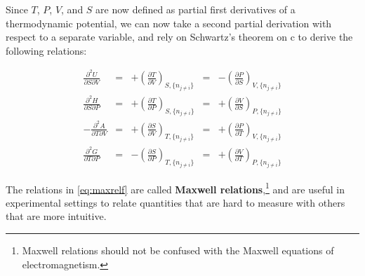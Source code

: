 \documentclass[
]{book}
\theoremstyle{definition}
\theoremstyle{definition}
\theoremstyle{definition}
\theoremstyle{remark}
\begin{document}
Since \(T\), \(P\), \(V\), and \(S\) are now defined as partial first derivatives of a thermodynamic potential, we can now take a second partial derivation with respect to a separate variable, and rely on Schwartz's theorem on c to derive the following relations:

\begin{equation}
\begin{aligned}
\frac{\partial^2 U }{\partial S \partial V} &=& +\left(\frac{\partial T}{\partial V}\right)_{S,\{n_{j \neq i}\}} &=& -\left(\frac{\partial P}{\partial S}\right)_{V,\{n_{j \neq i}\}}   \\
\frac{\partial^2 H }{\partial S \partial P} &=& +\left(\frac{\partial T}{\partial P}\right)_{S,\{n_{j \neq i}\}} &=& +\left(\frac{\partial V}{\partial S}\right)_{P,\{n_{j \neq i}\}}  \\
-\frac{\partial^2 A }{\partial T \partial V} &=& +\left(\frac{\partial S}{\partial V}\right)_{T,\{n_{j \neq i}\}} &=& +\left(\frac{\partial P}{\partial T}\right)_{V,\{n_{j \neq i}\}}  \\
\frac{\partial^2 G }{\partial T \partial P} &=& -\left(\frac{\partial S}{\partial P}\right)_{T,\{n_{j \neq i}\}} &=& +\left(\frac{\partial V}{\partial T}\right)_{P,\{n_{j \neq i}\}}
\end{aligned}
\label{eq:maxrelf}
\end{equation}

The relations in \eqref{eq:maxrelf} are called \textbf{Maxwell relations},\footnote{Maxwell relations should not be confused with the Maxwell equations of electromagnetism.} and are useful in experimental settings to relate quantities that are hard to measure with others that are more intuitive.
\end{document}
